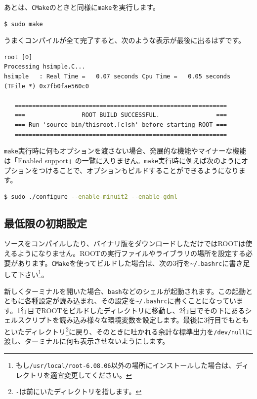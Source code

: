 あとは、\texttt{CMake}のときと同様に\texttt{make}を実行します。
\begin{lstlisting}[language=bash]
$ sudo make
\end{lstlisting}
うまくコンパイルが全て完了すると、次のような表示が最後に出るはずです。
\begin{lstlisting}
root [0] 
Processing hsimple.C...
hsimple   : Real Time =   0.07 seconds Cpu Time =   0.05 seconds
(TFile *) 0x7fb0fae560c0
 
   ============================================================
   ===                ROOT BUILD SUCCESSFUL.                ===
   === Run 'source bin/thisroot.[c]sh' before starting ROOT ===
   ============================================================
\end{lstlisting}

\texttt{make}実行時に何もオプションを渡さない場合、発展的な機能やマイナーな機能は「Enabled support」の一覧に入りません。\texttt{make}実行時に例えば次のようにオプションをつけることで、オプションもビルドすることができるようになります。

\begin{lstlisting}[language=bash]
$ sudo ./configure --enable-minuit2 --enable-gdml
\end{lstlisting}

\subsection{最低限の初期設定}
\label{subsec_settings}
ソースをコンパイルしたり、バイナリ版をダウンロードしただけではROOTは使えるようになりません。ROOTの実行ファイルやライブラリの場所を設定する必要があります。\texttt{CMake}を使ってビルドした場合は、次の3行を\texttt{\~{}/.bashrc}に書き足して下さい\footnote{もし\texttt{/usr/local/root-6.08.06}以外の場所にインストールした場合は、ディレクトリを適宜変更してください。}。
\begin{NoFloat}

\end{NoFloat}

新しくターミナルを開いた場合、\texttt{bash}などのシェルが起動されます。この起動とともに各種設定が読み込まれ、その設定を\texttt{\~{}/.bashrc}に書くことになっています。1行目でROOTをビルドしたディレクトリに移動し、2行目でその下にあるシェルスクリプトを読み込み様々な環境変数を設定します。最後に3行目でもともといたディレクトリ\footnote{\texttt{-}は前にいたディレクトリを指します。}に戻り、そのときに吐かれる余計な標準出力を\texttt{/dev/null}に渡し、ターミナルに何も表示させないようにします。

